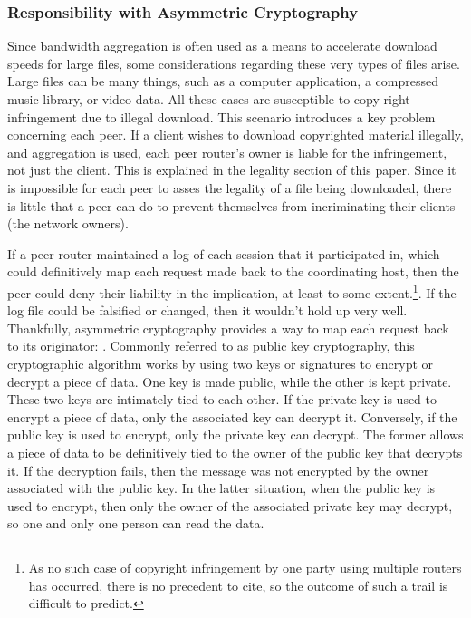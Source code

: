 \documentclass[12pt]{article}
\begin{document}
		\subsubsection{Responsibility with Asymmetric Cryptography}

			Since bandwidth aggregation is often used as a means to accelerate download speeds for large files, some considerations regarding these very types of files arise. Large files can be many things, such as a computer application, a compressed music library, or video data. All these cases are susceptible to copy right infringement due to illegal download. This scenario introduces a key problem concerning each peer. If a client wishes to download copyrighted material illegally, and aggregation is used, each peer router's owner is liable for the infringement, not just the client. This is explained in the legality section of this paper. Since it is impossible for each peer to asses the legality of a file being downloaded, there is little that a peer can do to prevent themselves from incriminating their clients (the network owners). 

			If a peer router maintained a log of each session that it participated in, which could definitively map each request made back to the coordinating host, then the peer could deny their liability in the implication, at least to some extent.\footnote{As no such case of copyright infringement by one party using multiple routers has occurred, there is no precedent to cite, so the outcome of such a trail is difficult to predict.}. If the log file could be falsified or changed, then it wouldn't hold up very well. Thankfully, asymmetric cryptography provides a way to map each request back to its originator: . Commonly referred to as public key cryptography, this cryptographic algorithm works by using two keys or signatures to encrypt or decrypt a piece of data. One key is made public, while the other is kept private. These two keys are intimately tied to each other. If the private key is used to encrypt a piece of data, only the associated key can decrypt it. Conversely, if the public key is used to encrypt, only the private key can decrypt. The former allows a piece of data to be definitively tied to the owner of the public key that decrypts it. If the decryption fails, then the message was not encrypted by the owner associated with the public key. In the latter situation, when the public key is used to encrypt, then only the owner of the associated private key may decrypt, so one and only one person can read the data.
\end{document}
